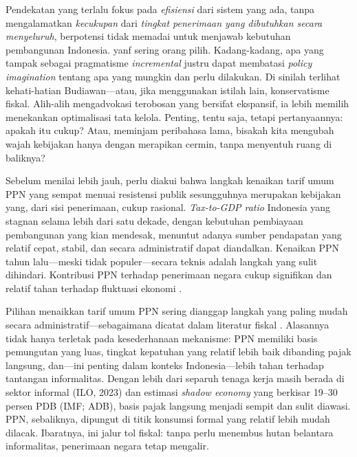 Pendekatan yang terlalu fokus pada \textit{efisiensi} dari sistem yang ada, tanpa mengalamatkan \textit{kecukupan} dari \textit{tingkat penerimaan yang dibutuhkan secara menyeluruh},  berpotensi tidak memadai untuk menjawab kebutuhan pembangunan Indonesia.  yanf sering orang pilih. Kadang-kadang, apa yang tampak sebagai pragmatisme \textit{incremental} justru dapat membatasi \textit{policy imagination} tentang apa yang mungkin dan perlu dilakukan. Di sinilah terlihat kehati-hatian Budiawan—atau, jika menggunakan istilah lain, konservatisme fiskal. Alih-alih mengadvokasi terobosan yang bersifat ekspansif, ia lebih memilih menekankan optimalisasi tata kelola. Penting, tentu saja, tetapi pertanyaannya: apakah itu cukup? Atau, meminjam peribahasa lama, bisakah kita mengubah wajah kebijakan hanya dengan merapikan cermin, tanpa menyentuh ruang di baliknya?

Sebelum menilai lebih jauh, perlu diakui bahwa langkah kenaikan tarif umum PPN yang sempat menuai resistensi publik sesungguhnya merupakan kebijakan yang, dari sisi penerimaan, cukup rasional. \textit{Tax-to-GDP ratio} Indonesia yang stagnan selama lebih dari satu dekade, dengan kebutuhan pembiayaan pembangunan yang kian mendesak, menuntut adanya sumber pendapatan yang relatif cepat, stabil, dan secara administratif dapat diandalkan. Kenaikan PPN tahun lalu—meski tidak populer—secara teknis adalah langkah yang sulit dihindari. Kontribusi PPN terhadap penerimaan negara cukup signifikan dan relatif tahan terhadap fluktuasi ekonomi \citep{saptono_2022_institutional,arvin_2021_are}. 

Pilihan menaikkan tarif umum PPN sering dianggap langkah yang paling mudah secara administratif—sebagaimana dicatat dalam literatur fiskal \citep{brautigam_2008_taxation, timmons_2005_the, akanbi_2019_state, addison_2018_fiscal, gaspar_2016_tax, iswahyudi_2021_getting}. Alasannya tidak hanya terletak pada kesederhanaan mekanisme: PPN memiliki basis pemungutan yang luas, tingkat kepatuhan yang relatif lebih baik dibanding pajak langsung, dan—ini penting dalam konteks Indonesia—lebih tahan terhadap tantangan informalitas. Dengan lebih dari separuh tenaga kerja masih berada di sektor informal (ILO, 2023) dan estimasi \textit{shadow economy} yang berkisar 19–30 persen PDB (IMF; ADB), basis pajak langsung menjadi sempit dan sulit diawasi. PPN, sebaliknya, dipungut di titik konsumsi formal yang relatif lebih mudah dilacak. Ibaratnya, ini jalur tol fiskal: tanpa perlu menembus hutan belantara informalitas, penerimaan negara tetap mengalir.  

